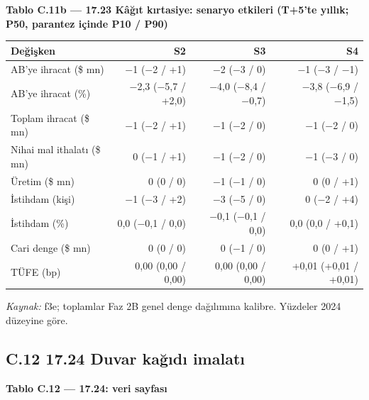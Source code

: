 \endgroup


\textbf{Tablo C.11b --- 17.23 Kâğıt kırtasiye: senaryo etkileri (T+5'te yıllık; P50, parantez içinde P10 / P90)}

\nopagebreak[4]

\begingroup\gbtablo\small

\begin{longtable}[]{@{}lrrr@{}}
\toprule\noalign{}
\textbf{Değişken} & \textbf{S2} & \textbf{S3} & \textbf{S4} \\
\midrule\noalign{}
\endhead
\bottomrule\noalign{}
\endlastfoot
AB'ye ihracat (\$ mn) & −1 (−2 / +1) & −2 (−3 / 0) & −1 (−3 / −1) \\
AB'ye ihracat (\%) & −2,3 (−5,7 / +2,0) & −4,0 (−8,4 / −0,7) & −3,8 (−6,9 / −1,5) \\
Toplam ihracat (\$ mn) & −1 (−2 / +1) & −1 (−2 / 0) & −1 (−2 / 0) \\
Nihai mal ithalatı (\$ mn) & 0 (−1 / +1) & −1 (−2 / 0) & −1 (−3 / 0) \\
Üretim (\$ mn) & 0 (0 / 0) & −1 (−1 / 0) & 0 (0 / +1) \\
İstihdam (kişi) & −1 (−3 / +2) & −3 (−5 / 0) & 0 (−2 / +4) \\
İstihdam (\%) & 0,0 (−0,1 / 0,0) & −0,1 (−0,1 / 0,0) & 0,0 (0,0 / +0,1) \\
Cari denge (\$ mn) & 0 (0 / 0) & 0 (−1 / 0) & 0 (0 / +1) \\
TÜFE (bp) & 0,00 (0,00 / 0,00) & 0,00 (0,00 / 0,00) & +0,01 (+0,01 / +0,01) \\
\end{longtable}

\endgroup

\emph{Kaynak:} \etiketT{} f3e; toplamlar Faz 2B genel denge dağılımına kalibre. Yüzdeler 2024 düzeyine göre.

\hypertarget{nace_kartlar_16-18-c12-1724-duvar-kaux11fux131dux131-imalatux131}{%
\subsection{C.12 17.24 Duvar kağıdı imalatı}\label{nace_kartlar_16-18-c12-1724-duvar-kaux11fux131dux131-imalatux131}}


\textbf{Tablo C.12 --- 17.24: veri sayfası}

\nopagebreak[4]

\begingroup\gbtablo\small

